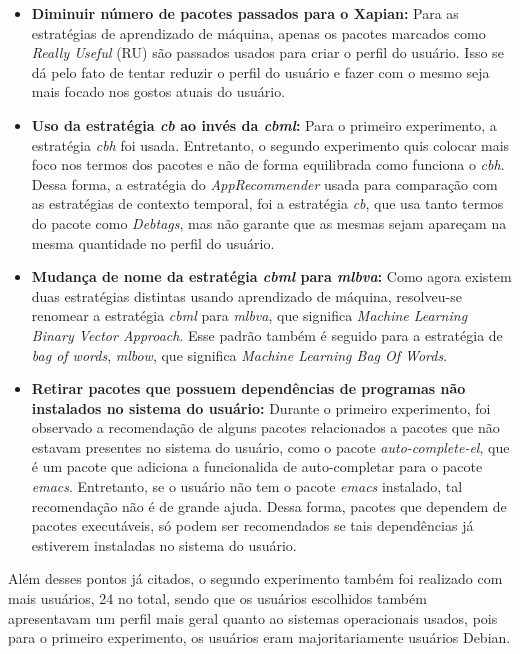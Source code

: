 \begin{itemize}
   \item \textbf{Diminuir número de pacotes passados para o Xapian:} Para as
   estratégias de aprendizado de máquina, apenas os pacotes marcados como
   \textit{Really Useful} (RU) são passados usados para criar o perfil do
   usuário. Isso se dá pelo fato de tentar reduzir o perfil do usuário e fazer
   com o mesmo seja mais focado nos gostos atuais do usuário.

   \item \textbf{Uso da estratégia \textit{cb} ao invés da \textit{cbml}:} Para
   o primeiro experimento, a estratégia \textit{cbh} foi usada. Entretanto,
   o segundo experimento quis colocar mais foco nos termos dos pacotes e
   não de forma equilibrada como funciona o \textit{cbh}. Dessa forma,
   a estratégia do \textit{AppRecommender} usada para comparação com as
   estratégias de contexto temporal, foi a estratégia \textit{cb}, que usa
   tanto termos do pacote como \textit{Debtags}, mas não garante que as mesmas sejam
   apareçam na mesma quantidade no perfil do usuário.

   \item \textbf{Mudança de nome da estratégia \textit{cbml} para
   \textit{mlbva}:} Como agora existem duas estratégias distintas usando
   aprendizado de máquina, resolveu-se renomear a estratégia \textit{cbml}
   para \textit{mlbva}, que significa \textit{Machine Learning Binary
   Vector Approach}. Esse padrão também é seguido para a estratégia de
   \textit{bag of words}, \textit{mlbow}, que significa \textit{Machine
   Learning Bag Of Words}.

   \item \textbf{Retirar pacotes que possuem dependências de programas não
   instalados no sistema do usuário:} Durante o primeiro experimento, foi
   observado a recomendação de alguns pacotes relacionados a pacotes que não
   estavam presentes no sistema do usuário, como o pacote
   \textit{auto-complete-el}, que é um pacote que adiciona a funcionalida
   de auto-completar para o pacote \textit{emacs}. Entretanto, se o usuário
   não tem o pacote \textit{emacs} instalado, tal recomendação não é de
   grande ajuda. Dessa forma, pacotes que dependem de pacotes executáveis,
   só podem ser recomendados se tais dependências já estiverem instaladas
   no sistema do usuário.
    
\end{itemize}

Além desses pontos já citados, o segundo experimento também foi realizado com
mais usuários, 24 no total, sendo que os usuários escolhidos também apresentavam
um perfil mais geral quanto ao sistemas operacionais usados, pois para o
primeiro experimento, os usuários eram majoritariamente usuários Debian.

